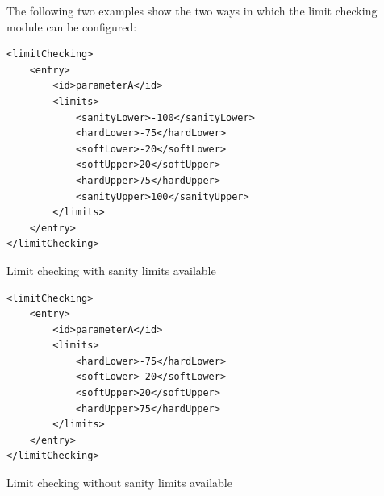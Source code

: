 The following two examples show the two ways in which the limit checking module can be configured:

\begin{table}[H]
\lstset{language=XML}
\begin{lstlisting}
<limitChecking>
	<entry>
		<id>parameterA</id>
		<limits>
			<sanityLower>-100</sanityLower>
			<hardLower>-75</hardLower>
			<softLower>-20</softLower>
			<softUpper>20</softUpper>
			<hardUpper>75</hardUpper>
			<sanityUpper>100</sanityUpper>
		</limits>
	</entry>
</limitChecking>
\end{lstlisting}
\caption{Limit checking with sanity limits available}
\label{Table5.6}
\end{table}

\begin{table}[H]
\lstset{language=XML}
\begin{lstlisting}
<limitChecking>
	<entry>
		<id>parameterA</id>
		<limits>
			<hardLower>-75</hardLower>
			<softLower>-20</softLower>
			<softUpper>20</softUpper>
			<hardUpper>75</hardUpper>
		</limits>
	</entry>
</limitChecking>
\end{lstlisting}
\caption{Limit checking without sanity limits available}
\label{Table5.7}
\end{table}


\newpage

